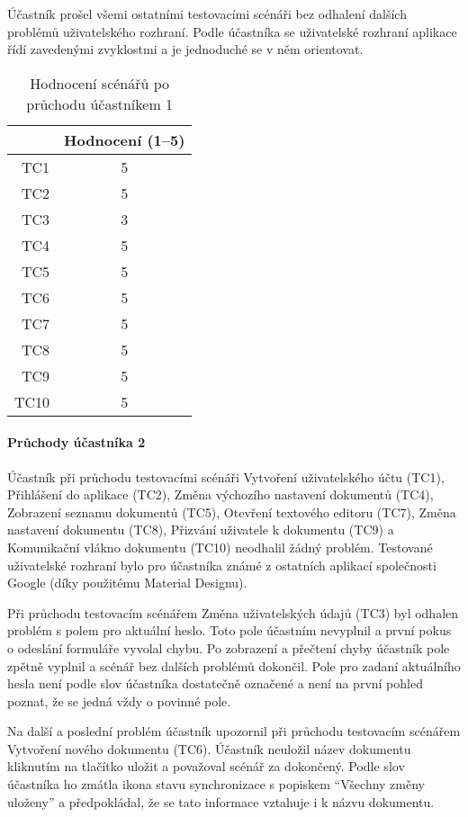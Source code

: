 Účastník prošel všemi ostatními testovacími scénáři bez odhalení dalších problémů uživatelského rozhraní.
Podle účastníka se uživatelské rozhraní aplikace řídí zavedenými zvyklostmi a je jednoduché se v něm orientovat.

\begin{table}[ht!]
    \centering
    \caption{Hodnocení scénářů po průchodu účastníkem 1}
    \label{tab:poPrůchoduÚčastníkem1}
    \begin{tabular}{r|c}
        & Hodnocení (1--5) \\ \hline
        TC1 & 5 \\
        TC2 & 5 \\
        TC3 & 3 \\
        TC4 & 5 \\
        TC5 & 5 \\
        TC6 & 5 \\
        TC7 & 5 \\
        TC8 & 5 \\
        TC9 & 5 \\
        TC10 & 5 \\
    \end{tabular}
\end{table}


\paragraph{Průchody účastníka 2}

Účastník při průchodu testovacími scénáři Vytvoření uživatelského účtu (TC1), Přihlášení do aplikace (TC2), Změna výchozího nastavení dokumentů (TC4), Zobrazení seznamu dokumentů (TC5),  Otevření textového editoru (TC7), Změna nastavení dokumentu (TC8), Přizvání uživatele k dokumentu (TC9) a Komunikační vlákno dokumentu (TC10) neodhalil žádný problém.
Testované uživatelské rozhraní bylo pro účastníka známé z ostatních aplikací společnosti Google (díky použitému Material Designu).

Při průchodu testovacím scénářem Změna uživatelských údajů (TC3) byl odhalen problém s polem pro aktuální heslo.
Toto pole účastním nevyplnil a první pokus o odeslání formuláře vyvolal chybu.
Po zobrazení a přečtení chyby účastník pole zpětně vyplnil a scénář bez dalších problémů dokončil.
Pole pro zadaní aktuálního hesla není podle slov účastníka dostatečně označené a není na první pohled poznat, že se jedná vždy o povinné pole.

Na další a poslední problém účastník upozornil při průchodu testovacím scénářem Vytvoření nového dokumentu (TC6).
Účastník neuložil název dokumentu kliknutím na tlačítko uložit a považoval scénář za dokončený.
Podle slov účastníka ho zmátla ikona stavu synchronizace s popiskem \enquote{Všechny změny uloženy} a předpokládal, že se tato informace vztahuje i k názvu dokumentu.

